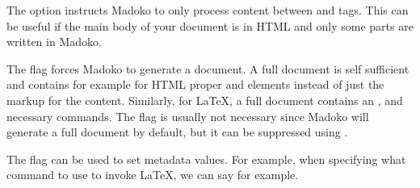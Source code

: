 \documentclass{book}
\begin{document}
\begin{mdP}[class={indent},data-line={3005}]%
{}The %
{}%
{} option instructs Madoko to only process content between
{}%
{} and %
{}%
{} tags. This can be useful if the main body of your document is
in HTML and only some parts are written in Madoko.%
\end{mdP}%
\begin{mdP}[class={indent},data-line={3009}]%
{}The %
{}%
{} flag forces Madoko to generate a %
{}%
{} document. A full
document is self sufficient and contains for example for HTML proper %
{}%
{}
and %
{}%
{} elements instead of just the markup for the content. Similarly,
for LaTeX, a full document contains an %
{}%
{},  %
{}%
{}
and necessary %
{}%
{} commands. The %
{}%
{} flag is usually not
necessary since Madoko will generate a full document by default, but 
it can be suppressed using %
{}%
{}.%
\end{mdP}%
\begin{mdP}[class={indent},data-line={3017}]%
{}The %
{}%
{} flag can be used to set metadata values. For example, when specifying
what command to use to invoke LaTeX, we can say %
{}%
{}
for example.%
\end{mdP}%
\end{document}
